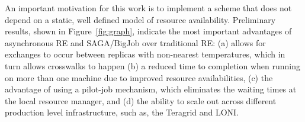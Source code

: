 \documentclass[a4paper,10pt]{article}
\newcommand{\athotanote}[1]{ {\textcolor{green} { ***athota: #1 }}}
\newcommand{\athotanote}[1]{}
\begin{document}





An important motivation for this work is to implement a scheme that does not depend on a
static, well defined model of resource availability. %
Preliminary results, shown in Figure~\ref{fig:graph}, indicate the most important advantages of asynchronous RE and SAGA/BigJob over traditional RE: (a) allows for exchanges to occur between replicas with non-nearest temperatures, which in turn allows crosswalks to happen (b) a reduced time to completion when running on more than one machine due to improved resource availabilities, (c) the advantage of using a pilot-job mechanism, which eliminates the waiting times at the local resource manager, and (d) the ability to scale out across different production level infrastructure, such as, the Teragrid and LONI.
\end{document}

